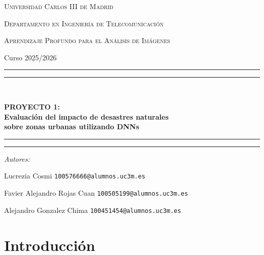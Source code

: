 \documentclass[11pt, a4paper]{article}
\begin{document}
\begin{titlepage}
    \centering
    \vspace*{2cm}
    
    {\scshape\Large Universidad Carlos III de Madrid \par}
    \vspace{0.5cm}
    {\scshape\large Departamento en Ingeniería de Telecomunicación \par}
    \vspace{2cm}
    
    {\scshape\Large Aprendizaje Profundo para el Análisis de Imágenes  \par}
    \vspace{0.5cm}
    {\large Curso 2025/2026 \par}
    
    \vspace{3cm}
    \rule{\textwidth}{0.4pt}\vspace*{-\baselineskip}\vspace{3.2pt}
    \rule{\textwidth}{1.6pt}\\[\baselineskip]
    {\huge\bfseries PROYECTO 1:\\[0.5cm] Evaluación del impacto de desastres naturales\\[0.3cm] sobre zonas urbanas utilizando DNNs \par}
    \vspace{0.2cm}
    \rule{\textwidth}{1.6pt}\vspace*{-\baselineskip}\vspace{3.2pt}
    \rule{\textwidth}{0.4pt}
    
    \vspace{3cm}
    
    {\Large\itshape Autores:\par}
    \vspace{0.5cm}
    {\Large  Lucrezia Cosmi \quad \texttt{100576666@alumnos.uc3m.es}\par}
    {\Large  Favier Alejandro Rojas Cuan \quad \texttt{100505199@alumnos.uc3m.es}\par}
    {\Large  Alejandro Gonzalez Chima \quad \texttt{100451454@alumnos.uc3m.es}\par}
    
    \vfill
\end{titlepage}

\newpage

\section{Introducción}
\end{document}
